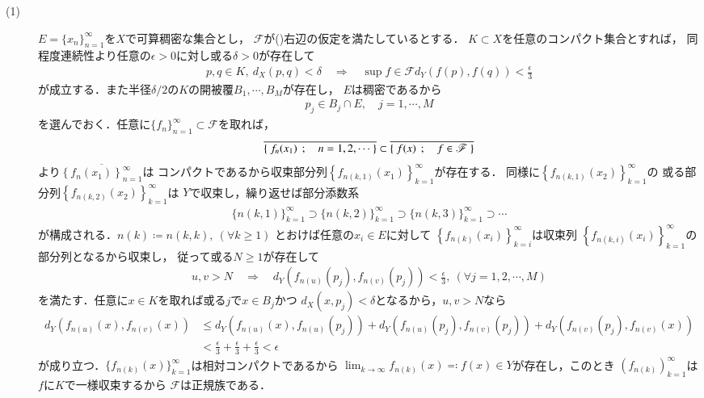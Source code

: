 	\begin{prf}\mbox{}
		\begin{description}
			\item[(1)]
				$E = \{x_n\}_{n=1}^\infty$を$X$で可算稠密な集合とし，
				$\mathscr{F}$が()右辺の仮定を満たしているとする．
				$K \subset X$を任意のコンパクト集合とすれば，
				同程度連続性より任意の$\epsilon > 0$に対し或る$\delta > 0$が存在して
				\begin{align}
					p,q \in K,\ d_X(p,q) < \delta \quad \Longrightarrow \quad
					\sup{f \in \mathscr{F}}{d_Y(f(p),f(q))} < \frac{\epsilon}{3}
				\end{align}
				が成立する．また半径$\delta/2$の$K$の開被覆$B_1,\cdots,B_M$が存在し，
				$E$は稠密であるから
				\begin{align}
					p_j \in B_j \cap E, \quad j=1,\cdots,M
				\end{align}
				を選んでおく．任意に$\{f_n\}_{n=1}^\infty \subset \mathscr{F}$を取れば，
				\begin{align}
					\overline{\left\{\ f_n(x_1)\ \, ; \quad n=1,2,\cdots\ \right\}}
					\subset \overline{\left\{\ f(x)\ \, ; \quad f \in \mathscr{F}\ \right\}}
				\end{align}
				より$\overline{\left\{f_{n}(x_1)\right\}_{n=1}^\infty}$は
				コンパクトであるから収束部分列$\left\{f_{n(k,1)}(x_1)\right\}_{k=1}^\infty$が存在する．
				同様に$\left\{f_{n(k,1)}(x_2)\right\}_{k=1}^\infty$の
				或る部分列$\left\{f_{n(k,2)}(x_2)\right\}_{k=1}^\infty$は
				$Y$で収束し，繰り返せば部分添数系
				\begin{align}
					\{n(k,1)\}_{k=1}^\infty \supset
					\{n(k,2)\}_{k=1}^\infty \supset
					\{n(k,3)\}_{k=1}^\infty \supset
					\cdots
				\end{align}
				が構成される．$n(k) \coloneqq n(k,k),\ (\forall k \geq 1)$
				とおけば任意の$x_i \in E$に対して
				$\left\{f_{n(k)}(x_i)\right\}_{k=i}^\infty$は収束列
				$\left\{f_{n(k,i)}(x_i)\right\}_{k=1}^\infty$の部分列となるから収束し，
				従って或る$N \geq 1$が存在して
				\begin{align}
					u,v > N \quad \Longrightarrow \quad
					d_Y\left(f_{n(u)}(p_j),f_{n(v)}(p_j)\right) < \frac{\epsilon}{3},
					\ (\forall j=1,2,\cdots,M)
				\end{align}
				を満たす．任意に$x \in K$を取れば或る$j$で$x \in B_j$かつ
				$d_X(x,p_j) < \delta$となるから，$u,v > N$なら
				\begin{align}
					d_Y(f_{n(u)}(x),f_{n(v)}(x)) 
					&\leq d_Y\left(f_{n(u)}(x),f_{n(u)}(p_j)\right) 
					+ d_Y\left(f_{n(u)}(p_j),f_{n(v)}(p_j)\right)
					+ d_Y\left(f_{n(v)}(p_j),f_{n(v)}(x)\right) \\
					&< \frac{\epsilon}{3} + \frac{\epsilon}{3} + \frac{\epsilon}{3} < \epsilon
				\end{align}
				が成り立つ．$\{f_{n(k)}(x)\}_{k=1}^\infty$は相対コンパクトであるから
				$\lim_{k \to \infty} f_{n(k)}(x) \eqqcolon f(x) \in Y$が存在し，このとき
				$\left(f_{n(k)}\right)_{k=1}^\infty$は$f$に$K$で一様収束するから
				$\mathscr{F}$は正規族である．
			

\end{description}
\end{prf}
